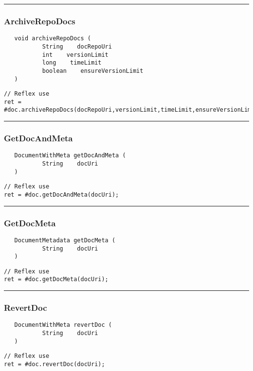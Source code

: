 \rule{15cm}{2pt}
\subsubsection{ArchiveRepoDocs}
\label{Api:ArchiveRepoDocs}
\begin{verbatim}
   void archiveRepoDocs (
           String    docRepoUri
           int    versionLimit
           long    timeLimit
           boolean    ensureVersionLimit
   )
\end{verbatim}
\begin{lstlisting}[language=reflex]
// Reflex use
ret = #doc.archiveRepoDocs(docRepoUri,versionLimit,timeLimit,ensureVersionLimit);
\end{lstlisting}



\rule{15cm}{2pt}
\subsubsection{GetDocAndMeta}
\label{Api:GetDocAndMeta}
\begin{verbatim}
   DocumentWithMeta getDocAndMeta (
           String    docUri
   )
\end{verbatim}
\begin{lstlisting}[language=reflex]
// Reflex use
ret = #doc.getDocAndMeta(docUri);
\end{lstlisting}



\rule{15cm}{2pt}
\subsubsection{GetDocMeta}
\label{Api:GetDocMeta}
\begin{verbatim}
   DocumentMetadata getDocMeta (
           String    docUri
   )
\end{verbatim}
\begin{lstlisting}[language=reflex]
// Reflex use
ret = #doc.getDocMeta(docUri);
\end{lstlisting}



\rule{15cm}{2pt}
\subsubsection{RevertDoc}
\label{Api:RevertDoc}
\begin{verbatim}
   DocumentWithMeta revertDoc (
           String    docUri
   )
\end{verbatim}
\begin{lstlisting}[language=reflex]
// Reflex use
ret = #doc.revertDoc(docUri);
\end{lstlisting}



